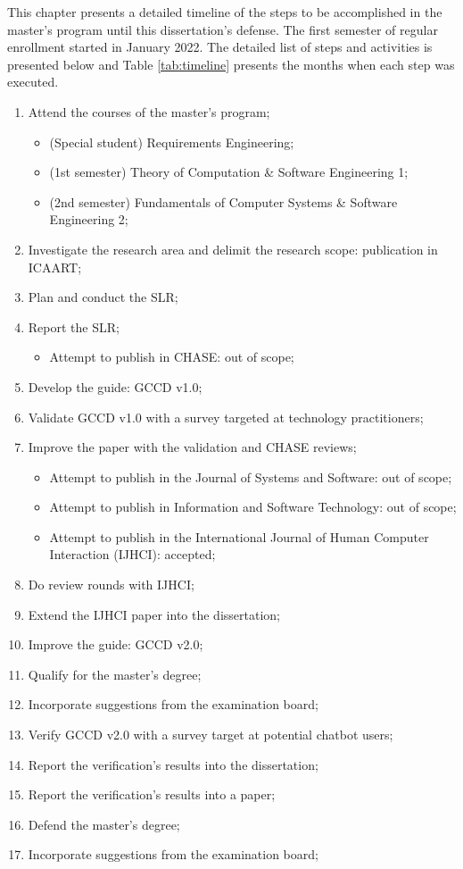 This chapter presents a detailed timeline of the steps to be accomplished in the master's program until this dissertation's defense. The first semester of regular enrollment started in January 2022. The detailed list of steps and activities is presented below and Table \ref{tab:timeline} presents the months when each step was executed.

\begin{enumerate}
    \item Attend the courses of the master's program;
    \begin{itemize}
        \item (Special student) Requirements Engineering;
        \item (1st semester) Theory of Computation \& Software Engineering 1;
        \item (2nd semester) Fundamentals of Computer Systems \& Software Engineering 2;
    \end{itemize}
    \item Investigate the research area and delimit the research scope: publication in ICAART;
    \item Plan and conduct the SLR;
    \item Report the SLR;
    \begin{itemize}
        \item Attempt to publish in CHASE: out of scope;
    \end{itemize}
    \item Develop the guide: GCCD v1.0;
    \item Validate GCCD v1.0 with a survey targeted at technology practitioners;
    \item Improve the paper with the validation and CHASE reviews;
    \begin{itemize}
        \item Attempt to publish in the Journal of Systems and Software: out of scope;
        \item Attempt to publish in Information and Software Technology: out of scope;
        \item Attempt to publish in the International Journal of Human Computer Interaction (IJHCI): accepted; 
    \end{itemize}
    \item Do review rounds with IJHCI;
    \item Extend the IJHCI paper into the dissertation;
    \item Improve the guide: GCCD v2.0;
    \item Qualify for the master's degree;
    \item Incorporate suggestions from the examination board;
    \item Verify GCCD v2.0 with a survey target at potential chatbot users;
    \item Report the verification's results into the dissertation;
    \item Report the verification's results into a paper;
    \item Defend the master's degree;
    \item Incorporate suggestions from the examination board;
\end{enumerate}


